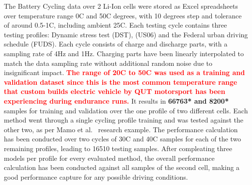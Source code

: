 %
The Battery Cycling data over 2 Li-Ion cells were stored as Excel spreadsheets over temperature range 0\textdegree{}C and 50\textdegree{}C degrees, with 10 degrees step and tolerance of around 0.5-1\textdegree{}C, including ambient 25\textdegree{}C.
Each testing cycle contains three testing profiles: Dynamic stress test (DST), (US06) and the Federal urban driving schedule (FUDS).
Each cycle consists of charge and discharge parts, with a sampling rate of 4Hz and 1Hz.
Charging parts have been linearly interpolated to match the data sampling rate without additional random noise due to insignificant impact.
\textcolor{red}{\textbf{The range of 20\textdegree{}C to 50\textdegree{}C was used as a training and validation dataset since this is the most common temperature range that custom builds electric vehicle by QUT motorsport has been experiencing during endurance runs.}}
It results in \textbf{66763* and 8200*} samples for training and validation over the one profile of two different cells.
Each method went through a single cycling profile training and was tested against the other two, as per Mamo et al.~\cite{mamo_long_2020} research example.
The performance calculation has been conducted over two cycles of 30\textdegree{}C and 40\textdegree{}C samples for each of the two remaining profiles, leading to 16510 testing samples.
After compleating three models per profile for every evaluated method, the overall performance calculation has been conducted against all samples of the second cell, making a good performance capture for any possible driving conditions.

